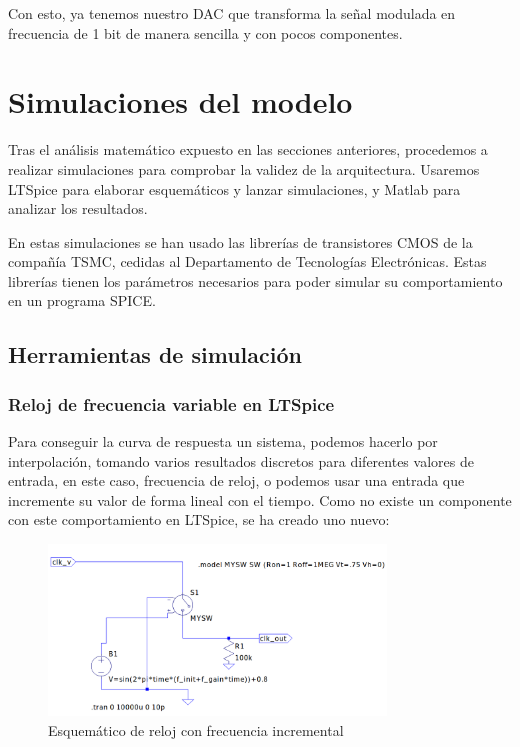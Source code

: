 \documentclass[12pt]{report} %
\begin{document}
	Con esto, ya tenemos nuestro DAC que transforma la señal modulada en frecuencia de 1 bit de manera sencilla y con pocos componentes.
	
	\section{Simulaciones del modelo}
	
	Tras el análisis matemático expuesto en las secciones anteriores, procedemos a realizar simulaciones para comprobar la validez de la arquitectura. Usaremos LTSpice para elaborar esquemáticos y lanzar simulaciones, y Matlab para analizar los resultados.
	
	En estas simulaciones se han usado las librerías de transistores CMOS de la compañía TSMC, cedidas al Departamento de Tecnologías Electrónicas. Estas librerías tienen los parámetros necesarios para poder simular su comportamiento en un programa SPICE.
	
	\subsection{Herramientas de simulación}
	
	\subsubsection{Reloj de frecuencia variable en LTSpice}
	Para conseguir la curva de respuesta un sistema, podemos hacerlo por interpolación, tomando varios resultados discretos para diferentes valores de entrada, en este caso, frecuencia de reloj, o podemos usar una entrada que incremente su valor de forma lineal con el tiempo. Como no existe un componente con este comportamiento en LTSpice, se ha creado uno nuevo:
	
	\begin{figure}[H]
		\includegraphics[width=0.8\textwidth]{ltspice-clk-freq.png}
		\caption[Esquemático de reloj con frecuencia incremental]{Esquemático de reloj con frecuencia incremental}
		\label{fig:ltspice-clk-freq.png}
	\end{figure}
	
\end{document}
